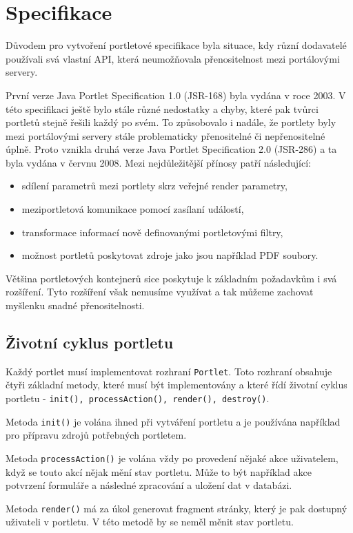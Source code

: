 \documentclass{fithesis}
\begin{document}
\section{Specifikace}
Důvodem pro vytvoření portletové specifikace byla situace, kdy různí dodavatelé používali svá vlastní API, která neumožňovala přenositelnost mezi portálovými servery.

První verze Java Portlet Specification 1.0 (JSR-168) byla vydána v roce 2003. V této specifikaci ještě bylo stále různé nedostatky a chyby, které pak tvůrci portletů stejně řešili každý po svém. To způsobovalo i nadále, že portlety byly mezi portálovými servery stále problematicky přenositelné či nepřenositelné úplně. Proto vznikla druhá verze Java Portlet Specification 2.0 (JSR-286) a ta byla vydána v červnu 2008. Mezi nejdůležitější přínosy patří následující:
\begin{itemize}
\item sdílení parametrů mezi portlety skrz veřejné render parametry,
\item meziportletová komunikace pomocí zasílaní událostí,
\item transformace informací nově definovanými portletovými filtry,
\item možnost portletů poskytovat zdroje jako jsou například PDF soubory.
\end{itemize}
Většina portletových kontejnerů sice poskytuje k základním požadavkům i svá rozšíření. Tyto rozšíření však nemusíme využívat a tak můžeme zachovat myšlenku snadné přenositelnosti.

\subsection{Životní cyklus portletu}
Každý portlet musí implementovat rozhraní \verb|Portlet|. Toto rozhraní obsahuje čtyři základní metody, které musí být implementovány a které řídí životní cyklus portletu - \verb|init(), processAction(), render(), destroy()|.

Metoda \verb|init()| je volána ihned při vytváření portletu a je používána například pro přípravu zdrojů potřebných portletem.

Metoda \verb|processAction()| je volána vždy po provedení nějaké akce uživatelem, když se touto akcí nějak mění stav portletu. Může to být například akce potvrzení formuláře a následné zpracování a uložení dat v databázi.

Metoda \verb|render()| má za úkol generovat fragment stránky, který je pak dostupný uživateli v portletu. V této metodě by se neměl měnit stav portletu.
\end{document}
